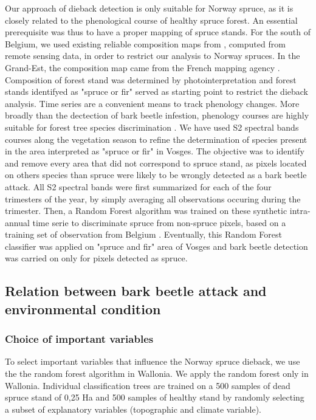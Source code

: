 \documentclass[3p,procedia]{elsarticle}
\begin{document}
Our approach of dieback detection is only suitable for Norway spruce, as it is closely related to the phenological course of healthy spruce forest.
An essential prerequisite was thus to have a proper mapping of spruce stands.
For the south of Belgium, we used existing reliable composition maps from \cite{bolyn_mapping_2022}, computed from remote sensing data, in order to restrict our analysis to Norway spruces.
In the Grand-Est, the composition map came from the French mapping agency \citep{IGN_bd_2018}. 
Composition of forest stand was determined by photointerpretation and forest stands identifyed as "spruce or fir" served as starting point to restrict the dieback analysis.
Time series are a convenient means to track phenology changes. 
More broadly than the dectection of bark beetle infestion, phenology courses are highly suitable for forest tree species discrimination \citep{lisein_discrimination_2015,grabska_forest_2019,ma_tree_2021}.
We have used S2 spectral bands courses along the vegetation season to refine the determination of species present in the area interpreted as "spruce or fir" in Vosges.
The objective was to identify and remove every area that did not correspond to spruce stand, as pixels located on others species than spruce were likely to be wrongly detected as a bark beetle attack.
All S2 spectral bands were first summarized for each of the four trimesters of the year, by simply averaging all observations occuring during the trimester.
Then, a Random Forest algorithm was trained on these synthetic intra-annual time serie to discriminate spruce from non-spruce pixels, based on a training set of observation from Belgium \citep{bolyn_forest_2018}.
Eventually, this Random Forest classifier was applied on "spruce and fir" area of Vosges and bark beetle detection was carried on only for pixels detected as spruce. 

\subsection{Relation between bark beetle attack and environmental condition}

\subsubsection{Choice of important variables}

To select important variables that influence the Norway spruce dieback, we use the the random forest algorithm \citep{genuer_vsurf_2015} in Wallonia.
We apply the random forest only in Wallonia.
Individual classification trees are trained on a 500 samples of dead spruce stand of 0,25 Ha and 500 samples of healthy stand by randomly selecting a subset of explanatory variables (topographic and  climate variable).
\end{document}
